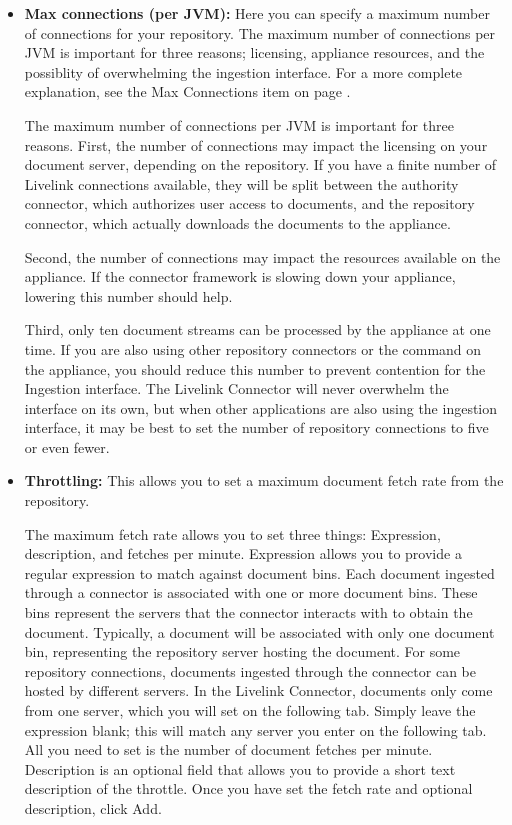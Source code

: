 \begin{itemize}

\item \textbf{Max connections (per JVM):} Here you can specify a
maximum number of connections for your repository. \ifCombinedConnectorGuide
The maximum number of connections per JVM is important for three
reasons; licensing, appliance resources, and the possiblity of
overwhelming the ingestion interface. For a more complete explanation,
see the Max Connections item on page \pageref{maxrepocon}.\fi

\ifLivelinkGuide
The maximum number of connections per JVM is important for three reasons.
First, the number of connections may impact the licensing on your document
server, depending on the repository. If you have a finite number of
Livelink connections available, they will be split between the authority
connector, which authorizes user access to documents, and the repository
connector, which actually downloads the documents to the appliance.

Second, the number of connections may impact the resources
available on the appliance. If the connector framework is slowing down
your appliance, lowering this number should help.

Third, only ten document streams can be processed by the appliance
at one time.  If you are also using other repository connectors or
the  command on the appliance, you should reduce this
number to prevent contention for the Ingestion interface. The Livelink
Connector will never overwhelm the interface on its own, but when other
applications are also using the ingestion interface, it may be best to
set the number of repository connections to five or even fewer.
\fi

\item \textbf{Throttling:} This allows you to set a maximum document
fetch rate from the repository.


The maximum fetch rate allows you to set three things: Expression,
description, and fetches per minute. Expression allows you to provide
a regular expression to match against document bins.  Each document
ingested through a connector is associated with one or more document
bins. These bins represent the servers that the connector interacts
with to obtain the document.  Typically, a document will be associated
with only one document bin, representing the repository server hosting
the document. For some repository connections, documents ingested
through the connector can be hosted by different servers. In the
Livelink Connector, documents only come from one server, which you
will set on the following tab. Simply leave the expression blank; this
will match any server you enter on the following tab.  All you need to
set is the number of document fetches per minute.  Description is an
optional field that allows you to provide a short text description of
the throttle.  Once you have set the fetch rate and optional
description, click Add.


\end{itemize}

